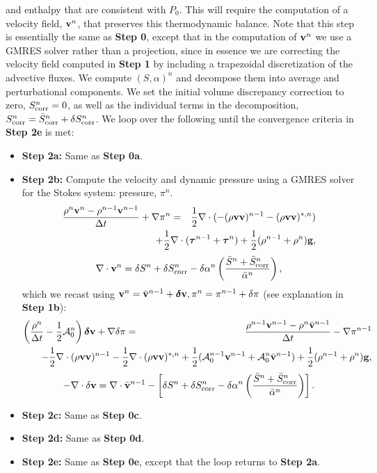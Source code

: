 \documentclass[final]{siamltex}
\def\gb {{\bf g}}
\def\vb {{\bf v}}
\def\deltab {\boldsymbol{\delta}}
\def\taub   {\boldsymbol{\tau}}
\def\half   {\frac{1}{2}}
\begin{document}
and enthalpy that are consistent with $P_0$.  This will
require the computation of a velocity field, $\vb^n$, that preserves this
thermodynamic balance.  Note that this step is essentially the same as
{\bf Step 0}, except that in the computation of $\vb^n$ we use a GMRES
solver rather than a projection, since in essence we are correcting the velocity
field computed in {\bf Step 1} by including a trapezoidal discretization of the 
advective fluxes.
We compute $(S,\alpha)^n$ and decompose them
into average and perturbational components.
We set the initial volume discrepancy correction to zero, 
$S_{\rm corr}^n = 0$, as well as the individual terms in the decomposition,
$S_{\rm corr}^n = \bar{S}_{\rm corr}^n + \delta S_{\rm corr}^n$.
We loop over the following until the convergence criteria in {\bf Step 2e} is met:\\
\begin{itemize}
\item {\bf Step 2a:} Same as {\bf Step 0a}.
\item {\bf Step 2b:} Compute the velocity and dynamic pressure using a GMRES solver for the Stokes system:
pressure, $\pi^n$.
\begin{eqnarray}
\frac{\rho^n\vb^n - \rho^{n-1}\vb^{n-1}}{\Delta t} + \nabla\pi^n &=& \half\nabla\cdot(-(\rho\vb\vb)^{n-1} - (\rho\vb\vb)^{*,n})\nonumber\\
&&\hspace{-0.5in} + \frac{1}{2}\nabla\cdot(\taub^{n-1} + \taub^n) + \frac{1}{2}(\rho^{n-1} + \rho^n)\gb,
\end{eqnarray}
\begin{equation}
\nabla\cdot\vb^n = \delta S^n + \delta S_{\rm corr}^n - \delta\alpha^n\left(\frac{\bar{S}^n + \bar{S}_{\rm corr}^n}{\bar{\alpha}^n}\right),
\end{equation}
which we recast using $\vb^n = \bar{\vb}^{n-1} + \deltab\vb, \pi^n = \pi^{n-1} + \delta\pi$ (see explanation in {\bf Step 1b}):
\begin{eqnarray}
\left(\frac{\rho^n}{\Delta t} - \half\mathcal{A}_0^n\right)\deltab\vb + \nabla\delta\pi &=& \frac{\rho^{n-1}\vb^{n-1} - \rho^n\bar{\vb}^{n-1}}{\Delta t} - \nabla\pi^{n-1}\nonumber\\
&&\hspace{-1.5in} - \half\nabla\cdot(\rho\vb\vb)^{n-1} -\half\nabla\cdot(\rho\vb\vb)^{*,n} + \half(\mathcal{A}_0^{n-1}\vb^{n-1}+\mathcal{A}_0^n\bar{\vb}^{n-1}) + \half(\rho^{n-1} + \rho^n)\gb,\nonumber\\
\end{eqnarray}
\begin{equation}
-\nabla\cdot\delta\vb = \nabla\cdot\bar{\vb}^{n-1} - \left[\delta S^n + \delta S_{\rm corr}^n - \delta\alpha^n\left(\frac{\bar{S}^n + \bar{S}_{\rm corr}^n}{\bar{\alpha}^n}\right)\right].
\end{equation}
\item {\bf Step 2c:} Same as {\bf Step 0c}.
\item {\bf Step 2d:} Same as {\bf Step 0d}.
\item {\bf Step 2e:} Same as {\bf Step 0e}, except that the loop returns to {\bf Step 2a}.
\end{itemize}
\end{document}
